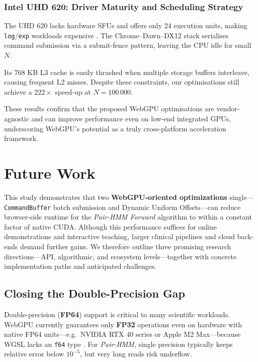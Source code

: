 \documentclass[PhD]{PHlab-thesis}
\begin{document}
\subsection{Intel UHD 620: Driver Maturity and Scheduling Strategy}
The UHD 620 lacks hardware SFUs and offers only 24 execution units, making \texttt{log}/\texttt{exp} workloads expensive \cite{Intel2018-uhd620}.  
The Chrome–Dawn–DX12 stack serialises command submission via a submit-fence pattern, leaving the CPU idle for small $N$.

Its 768 KB L3 cache is easily thrashed when multiple storage buffers interleave, causing frequent L2 misses.  
Despite these constraints, our optimisations still achieve a $222\times$ speed-up at $N = 100\,000$.

These results confirm that the proposed WebGPU optimisations are vendor-agnostic and can improve performance even on low-end integrated GPUs, underscoring WebGPU’s potential as a truly cross-platform acceleration framework.





\chapter{Future Work}

This study demonstrates that two \textbf{WebGPU-oriented optimizations} single—\texttt{CommandBuffer} batch submission and Dynamic Uniform Offsets—can reduce browser-side runtime for the \emph{Pair-HMM Forward} algorithm to within a constant factor of native CUDA. Although this performance suffices for online demonstrations and interactive teaching, larger clinical pipelines and cloud back-ends demand further gains. We therefore outline three promising research directions—API, algorithmic, and ecosystem levels—together with concrete implementation paths and anticipated challenges.

\section{Closing the Double-Precision Gap}

Double-precision (\textbf{FP64}) support is critical to many scientific workloads. WebGPU currently guarantees only \textbf{FP32} operations even on hardware with native FP64 units—e.g.\ NVIDIA RTX 40 series or Apple M2 Max—because WGSL lacks an \texttt{f64} type \cite{W3C2024-webgpu,NVIDIA2023-cudaguide,Apple2023-m2max}. For \emph{Pair-HMM}, single precision typically keeps relative error below $10^{-5}$, but very long reads risk underflow.
\end{document}
